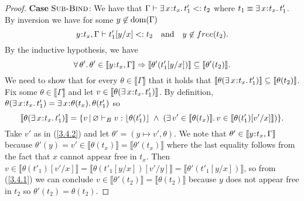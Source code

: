 \documentclass[11pt]{article}
\newcommand{\bind}{\hspace{0.05em}{:}\hspace{0.05em}} %
\newcommand{\lb}{\llbracket}         %
\newcommand{\rb}{\rrbracket}         %
\newcommand{\existype}[3]{\exists\, #1\bind #2.\, #3}
\newcommand{\dom}[1]{{\rm dom}(#1)}
\begin{document}
\begin{proof}
{\bf Case} $\textsc{Sub-Bind}$: We have that $\Gamma \vdash \exists\, x\bind t_x.\, t'_1 <: t_2$ where $t_1 \equiv \exists\, x\bind t_x.\, t'_1$. By inversion we have for some $y \not\in\dom{\Gamma}$
\[
y\bind t_x,\Gamma\vdash t'_1[y/x] <: t_2 \quad {\rm and}\quad y \not\in free(t_2).
\]
By the inductive hypothesis, we have
\begin{equation}
\forall\,\theta'.\, \theta'\in\lb y\bind t_x,\Gamma\rb \Rightarrow \lb\theta'(t'_1[y/x])\rb \subseteq \lb\theta'(t_2)\rb.
\label{3.4.1}	
\end{equation}
We need to show that for every $\theta \in \lb\Gamma\rb$ that it holds that $\lb \theta(\exists\, x\bind t_x.\, t'_1)\rb \subseteq \lb\theta(t_2)\rb$. Fix some $\theta \in \lb\Gamma\rb$ and let $v \in \lb \theta(\exists\, x\bind t_x.\, t'_1)\rb$. By definition, $\theta(\exists\, x\bind t_x.\, t'_1) = \exists\, x\bind \theta(t_x).\, \theta(t'_1)$ so
\begin{equation}\label{3.4.2}
\lb \theta(\existype{x}{t_x}{t'_1})\rb = \{ v \,|\, \varnothing \vdash_B v: \lfloor\theta(t'_1)\rfloor \;\wedge\; (\exists\,v' \in \lb\theta(t_x)\rb.\, v \in \lb\theta(t'_1)[v'/x]\rb)\}.
\end{equation}
Take $v'$ as in (\ref{3.4.2}) and let $\theta' = (y\mapsto v', \theta)$. We note that $\theta' \in \lb y\bind t_x,\Gamma\rb$ because $\theta'(y) = v' \in \lb\theta(t_x)\rb = \lb\theta'(t_x)\rb$ where the last equality follows from the fact that $x$ cannot appear free in $t_x$. Then $v \in \lb\theta(t'_1)[v'/x]\rb = \lb\theta(t'_1[y/x])[v'/y]\rb = \lb\theta'(t'_1[y/x])\rb$, so from (\ref{3.4.1}) we can conclude $v \in \lb\theta'(t_2)\rb = \lb\theta(t_2)\rb$ because $y$ does not appear free in $t_2$ so $\theta'(t_2)=\theta(t_2)$. 


\end{proof}
\end{document}
